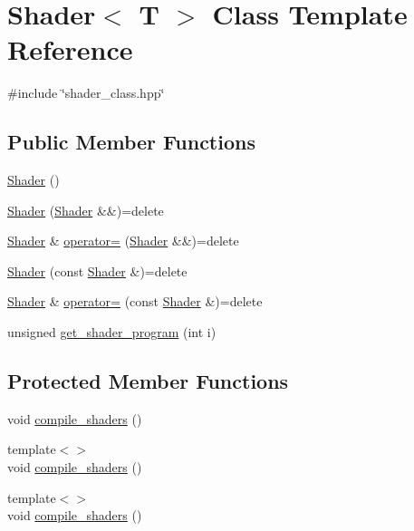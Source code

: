 \hypertarget{classShader}{}\section{Shader$<$ T $>$ Class Template Reference}
\label{classShader}


{\ttfamily \#include \char`\"{}shader\+\_\+class.\+hpp\char`\"{}}

\subsection*{Public Member Functions}
\begin{DoxyCompactItemize}
\item 
\mbox{\hyperlink{classShader_a02faa1d7140779d7a24e06d1aff58d68}{Shader}} ()
\item 
\mbox{\hyperlink{classShader_a7e30078f161d1c9f48a7b3921c01f816}{Shader}} (\mbox{\hyperlink{classShader}{Shader}} \&\&)=delete
\item 
\mbox{\hyperlink{classShader}{Shader}} \& \mbox{\hyperlink{classShader_a3b92fece66095389581a2bf6b3124657}{operator=}} (\mbox{\hyperlink{classShader}{Shader}} \&\&)=delete
\item 
\mbox{\hyperlink{classShader_a49b2a448a00b5e1413c17501f8873cca}{Shader}} (const \mbox{\hyperlink{classShader}{Shader}} \&)=delete
\item 
\mbox{\hyperlink{classShader}{Shader}} \& \mbox{\hyperlink{classShader_a58f724fecccecdb1633e08ce0258da37}{operator=}} (const \mbox{\hyperlink{classShader}{Shader}} \&)=delete
\item 
unsigned \mbox{\hyperlink{classShader_a2c19b216850480109f9d5f7ed6ab6aa6}{get\+\_\+shader\+\_\+program}} (int i)
\end{DoxyCompactItemize}
\subsection*{Protected Member Functions}
\begin{DoxyCompactItemize}
\item 
void \mbox{\hyperlink{classShader_a1176d69a08aef6df3b7850104871a839}{compile\+\_\+shaders}} ()
\item 
{\footnotesize template$<$$>$ }\\void \mbox{\hyperlink{classShader_a3ffd553eceda4e9d5a1d8b4a5a157659}{compile\+\_\+shaders}} ()
\item 
{\footnotesize template$<$$>$ }\\void \mbox{\hyperlink{classShader_ae486635d367b6054482c56747ed74846}{compile\+\_\+shaders}} ()
\end{DoxyCompactItemize}
